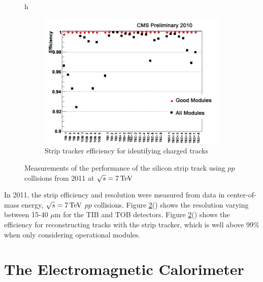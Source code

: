 \begin{figure}{h}
\begin{subfigure}[h]{0.450\textwidth}
        \includegraphics[width=\textwidth]{Figures/CMS_Diagrams/Tracker__Strip_efficiency_end2010.png}
        \caption{Strip tracker efficiency for identifying charged
          tracks \cite{CMS:tracker_strip_resolution}}\label{fig:tracker_strip_efficiency}
      \end{subfigure}
      \caption{Measurements of the performance of the silicon strip
        track using $pp$ collisions from 2011 at $\sqrt{s}=7 \,\text{Te\hspace{-.08em}V}$}\label{fig:tracker_strip_performance}
\end{figure}

\par In 2011, the strip efficiency and resolution were measured from data
in center-of-mass energy, $\sqrt{s}=7 \,\text{Te\hspace{-.08em}V}$ $pp$ collisions.  Figure
\ref{fig:tracker_strip_performance}()
shows the resolution varying between 15-40 $\mu$m for the TIB and TOB
detectors.  Figure
\ref{fig:tracker_strip_performance}()
shows the efficiency for reconstructing tracks with the strip tracker,
which is well above 99$\%$ when only considering operational modules.   


\section{The Electromagnetic Calorimeter}
\label{ecal_description}

